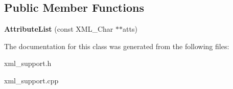\subsection*{Public Member Functions}
\begin{DoxyCompactItemize}
\item 
{\bfseries Attribute\+List} (const X\+M\+L\+\_\+\+Char $\ast$$\ast$atts)\hypertarget{classXMLSupport_1_1AttributeList_aa068b6c840bd4ef8eda73a6cf43d858b}{}\label{classXMLSupport_1_1AttributeList_aa068b6c840bd4ef8eda73a6cf43d858b}

\end{DoxyCompactItemize}


The documentation for this class was generated from the following files\+:\begin{DoxyCompactItemize}
\item 
xml\+\_\+support.\+h\item 
xml\+\_\+support.\+cpp\end{DoxyCompactItemize}
